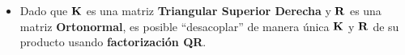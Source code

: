 \begin{frame}
\begin{itemize}
\begin{equation*}
\begin{bNiceMatrix}[margin]
        f_x & s & c_x \\
        0 & f_y & c_y \\
        0 & 0 & 1
      \end{bNiceMatrix}
      \begin{bNiceMatrix}[margin]
        \CodeBefore
        \rectanglecolor{green!40}{1-1}{3-3}
        \Body
          r_{11} & r_{12} & r_{13} \\
          r_{21} & r_{22} & r_{23} \\
          r_{31} & r_{32} & r_{33}
      \end{bNiceMatrix} = \intrinsicMatrix \rotation
    \end{equation*}

    \item Dado que $\boldsymbol{\mathbf{K}}$ es una matriz \textbf{Triangular Superior Derecha} y $\boldsymbol{\mathbf{R}}$ es una matriz \textbf{Ortonormal}, es posible ``desacoplar'' de manera única $\boldsymbol{\mathbf{K}}$ y $\boldsymbol{\mathbf{R}}$ de su producto usando \textbf{factorización QR}.
  \end{itemize}
\end{frame}

